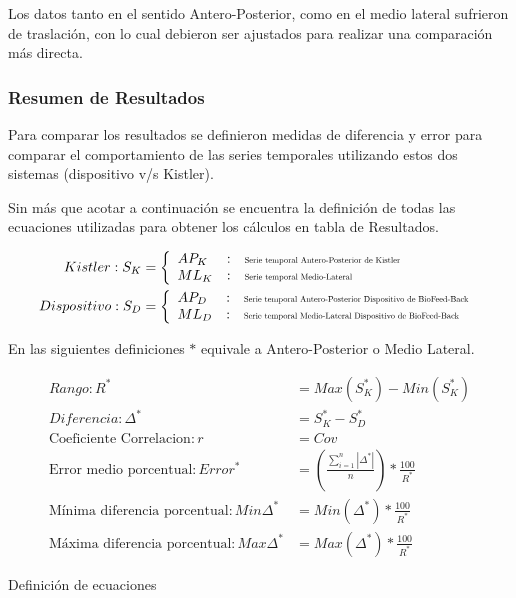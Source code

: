 \documentclass[12pt,a4paper]{article}
\newcommand{\nombreDispositivo}{Dispositivo de BioFeed-Back }
\begin{document}
Los datos tanto en el sentido Antero-Posterior, como en el medio lateral sufrieron de traslación, con lo cual debieron ser ajustados para realizar una comparación más directa.

\newpage
\subsubsection{Resumen de Resultados}

Para comparar los resultados se definieron medidas de diferencia y error para comparar el comportamiento de las series temporales utilizando estos dos sistemas (dispositivo v/s Kistler). 

Sin más que acotar a continuación se encuentra la definición de todas las ecuaciones utilizadas para obtener los cálculos  en tabla de Resultados.
\newline

\begin{table}[H]
	\begin{tcolorbox}[colframe=black,title=Definición de ecuaciones,center title]	
		
		\begin{align}
		{Kistler}:S_{K} &= \left\lbrace \begin{array}{lcl}
		AP_{K} & : & \scalebox{0.6}{\textrm{Serie temporal Antero-Posterior de Kistler}}\\
		ML_{K} & : & \scalebox{0.6}{\textrm{Serie temporal Medio-Lateral}}\\
		\end{array} \right. \label{eq:seriesKistler} \\
		{Dispositivo}:S_{D} &= \left\lbrace \begin{array}{lcl}
		AP_{D} & : & \scalebox{0.6}{\textrm{Serie temporal Antero-Posterior \nombreDispositivo}}\\
		ML_{D} & : & \scalebox{0.6}{\textrm{Serie temporal Medio-Lateral \nombreDispositivo}}
		\end{array} \right. \label{eq:seriesDisposito}
		\end{align}
		
		En las siguientes definiciones $*$ equivale a Antero-Posterior o Medio Lateral.
		
		\begin{align} 
		Rango:	R^{*}&=Max(S_{K}^{*})-Min(S_{K}^{*})\\
		Diferencia:	\Delta^{*}&=S_{K}^{*}-S_{D}^{*}\\
		\textrm{Coeficiente Correlacion}: r&=Cov\\
		\textrm{Error medio porcentual}:	Error^{*}&=\left( \frac{\sum\limits_{i=1}^{n}|\Delta^{*}|}{n} \right)*\frac{100}{R^{*}} \\
		\textrm{Mínima diferencia porcentual}:	Min\Delta^{*}&=Min(\Delta^{*})*\frac{100}{R^{*}}\\
		\textrm{Máxima diferencia porcentual}:	Max\Delta^{*}&=Max(\Delta^{*})*\frac{100}{R^{*}}
		\end{align}	
	\end{tcolorbox}
	\caption{Definición de ecuaciones}
	\label{table:definicionEcuaciones}
\end{table}
\end{document}
